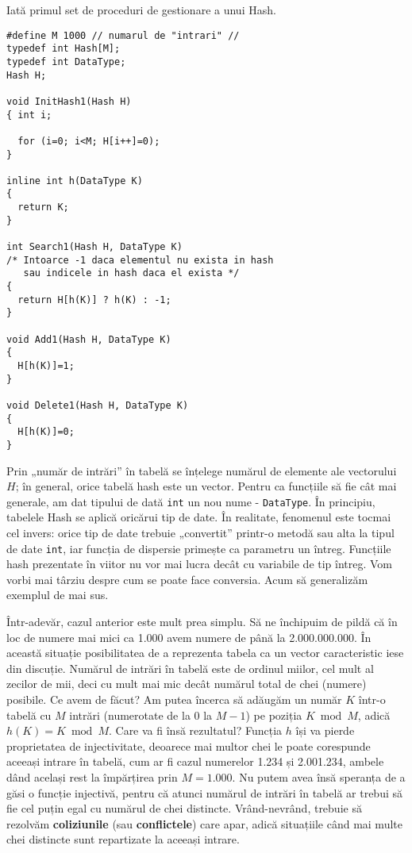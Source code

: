 Iată primul set de proceduri de gestionare a unui Hash.

\begin{verbatim}
#define M 1000 // numarul de "intrari" //
typedef int Hash[M];
typedef int DataType;
Hash H;

void InitHash1(Hash H)
{ int i;

  for (i=0; i<M; H[i++]=0);
}

inline int h(DataType K)
{
  return K;
}

int Search1(Hash H, DataType K)
/* Intoarce -1 daca elementul nu exista in hash
   sau indicele in hash daca el exista */
{
  return H[h(K)] ? h(K) : -1;
}

void Add1(Hash H, DataType K)
{
  H[h(K)]=1;
}

void Delete1(Hash H, DataType K)
{
  H[h(K)]=0;
}
\end{verbatim}

Prin „număr de intrări” în tabelă se înțelege numărul de elemente ale
vectorului $H$; în general, orice tabelă hash este un vector. Pentru ca
funcțiile să fie cât mai generale, am dat tipului de dată {\tt int} un nou
nume - {\tt DataType}. În principiu, tabelele Hash se aplică oricărui tip de
date. În realitate, fenomenul este tocmai cel invers: orice tip de date
trebuie „convertit” printr-o metodă sau alta la tipul de date {\tt int}, iar
funcția de dispersie primește ca parametru un întreg. Funcțiile hash
prezentate în viitor nu vor mai lucra decât cu variabile de tip întreg. Vom
vorbi mai târziu despre cum se poate face conversia. Acum să generalizăm
exemplul de mai sus.

Într-adevăr, cazul anterior este mult prea simplu. Să ne închipuim de pildă că
în loc de numere mai mici ca 1.000 avem numere de până la 2.000.000.000. În
această situație posibilitatea de a reprezenta tabela ca un vector
caracteristic iese din discuție. Numărul de intrări în tabelă este de ordinul
miilor, cel mult al zecilor de mii, deci cu mult mai mic decât numărul total
de chei (numere) posibile. Ce avem de făcut? Am putea încerca să adăugăm un
număr $K$ într-o tabelă cu $M$ intrări (numerotate de la 0 la $M-1$) pe
poziția $K \bmod M$, adică $h(K)=K \bmod M$. Care va fi însă rezultatul?
Funcția $h$ își va pierde proprietatea de injectivitate, deoarece mai multor
chei le poate corespunde aceeași intrare în tabelă, cum ar fi cazul numerelor
1.234 și 2.001.234, ambele dând același rest la împărțirea prin $M=1.000$. Nu
putem avea însă speranța de a găsi o funcție injectivă, pentru că atunci
numărul de intrări în tabelă ar trebui să fie cel puțin egal cu numărul de
chei distincte. Vrând-nevrând, trebuie să rezolvăm {\bf coliziunile} (sau {\bf
  conflictele}) care apar, adică situațiile când mai multe chei distincte sunt
repartizate la aceeași intrare.

